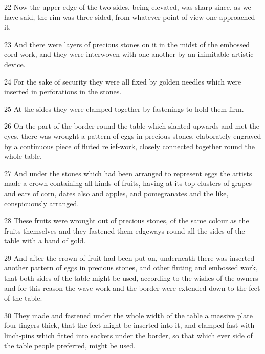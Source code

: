 \par 22 Now the upper edge of the two sides, being elevated, was sharp since, as we have said, the rim was three-sided, from whatever point of view one approached it.

\par 23 And there were layers of precious stones on it in the midst of the embossed cord-work, and they were interwoven with one another by an inimitable artistic device.

\par 24 For the sake of security they were all fixed by golden needles which were inserted in perforations in the stones.

\par 25 At the sides they were clamped together by fastenings to hold them firm.

\par 26 On the part of the border round the table which slanted upwards and met the eyes, there was wrought a pattern of eggs in precious stones, elaborately engraved by a continuous piece of fluted relief-work, closely connected together round the whole table.

\par 27 And under the stones which had been arranged to represent eggs the artists made a crown containing all kinds of fruits, having at its top clusters of grapes and ears of corn, dates also and apples, and pomegranates and the like, conspicuously arranged.

\par 28 These fruits were wrought out of precious stones, of the same colour as the fruits themselves and they fastened them edgeways round all the sides of the table with a band of gold.

\par 29 And after the crown of fruit had been put on, underneath there was inserted another pattern of eggs in precious stones, and other fluting and embossed work, that both sides of the table might be used, according to the wishes of the owners and for this reason the wave-work and the border were extended down to the feet of the table.

\par 30 They made and fastened under the whole width of the table a massive plate four fingers thick, that the feet might be inserted into it, and clamped fast with linch-pins which fitted into sockets under the border, so that which ever side of the table people preferred, might be used.

